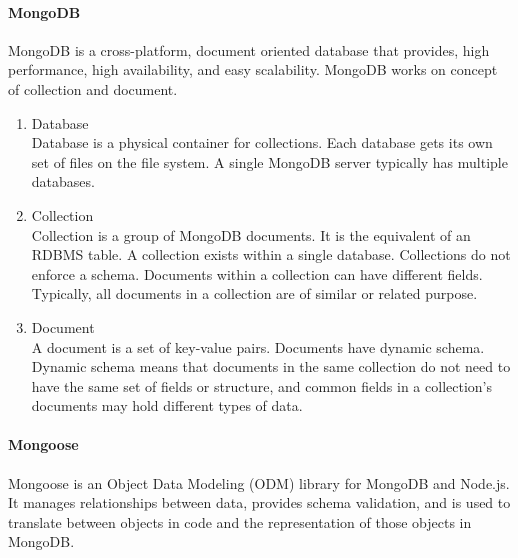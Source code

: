 \paragraph{MongoDB}
MongoDB is a cross-platform, document oriented database that provides, high performance, high availability, and easy scalability. MongoDB works on concept of collection and document.
\begin{enumerate}
      \item
            Database\\
            Database is a physical container for collections. Each database gets its own set of files on the file system. A single MongoDB server typically has multiple databases.
      \item
            Collection\\
            Collection is a group of MongoDB documents. It is the equivalent of an RDBMS table. A collection exists within a single database. Collections do not enforce a schema. Documents within a collection can have different fields. Typically, all documents in a collection are of similar or related purpose.
      \item
            Document\\
            A document is a set of key-value pairs. Documents have dynamic schema. Dynamic schema means that documents in the same collection do not need to have the same set of fields or structure, and common fields in a collection's documents may hold different types of data.
\end{enumerate}





\paragraph{Mongoose}
Mongoose is an Object Data Modeling (ODM) library for MongoDB and Node.js. It manages relationships between data, provides schema validation, and is used to translate between objects in code and the representation of those objects in MongoDB.











